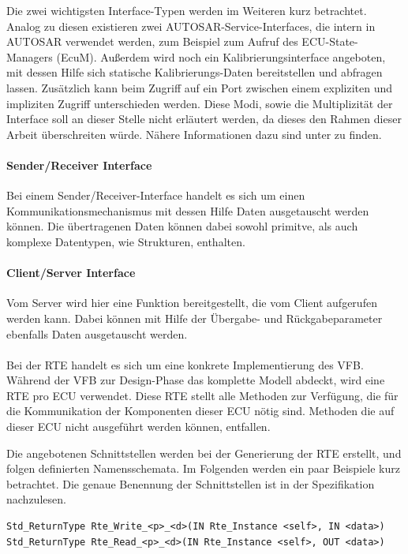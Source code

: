 \documentclass[
  a4paper,					    %
  twoside,
  DIV=calc,     				%
  bibliography=totoc,
  cleardoublepage=empty,
  ngerman,     					%
  final       					%
]{scrbook}
\begin{document}
Die zwei wichtigsten Interface-Typen werden im Weiteren kurz betrachtet. Analog zu diesen existieren zwei AUTOSAR-Service-Interfaces, die intern in AUTOSAR verwendet werden, zum Beispiel zum Aufruf des ECU-State-Managers (EcuM). Außerdem wird noch ein Kalibrierungsinterface angeboten, mit dessen Hilfe sich statische Kalibrierungs-Daten bereitstellen und abfragen lassen. Zusätzlich kann beim Zugriff auf ein Port zwischen einem expliziten und impliziten Zugriff unterschieden werden. Diese Modi, sowie die Multiplizität der Interface soll an dieser Stelle nicht erläutert werden, da dieses den Rahmen dieser Arbeit überschreiten würde. Nähere Informationen dazu sind unter \cite[Seite 101 ff.]{SE_Autosar} zu finden.

\paragraph{Sender/Receiver Interface}
Bei einem Sender/Receiver-Interface handelt es sich um einen Kommunikationsmechanismus mit dessen Hilfe Daten ausgetauscht werden können. Die übertragenen Daten können dabei sowohl primitve, als auch komplexe Datentypen, wie Strukturen, enthalten.

\paragraph{Client/Server Interface}
Vom Server wird hier eine Funktion bereitgestellt, die vom Client aufgerufen werden kann. Dabei können mit Hilfe der Übergabe- und Rückgabeparameter ebenfalls Daten ausgetauscht werden.

\paragraph*{}
Bei der RTE handelt es sich um eine konkrete Implementierung des VFB. Während der VFB zur Design-Phase das komplette Modell abdeckt, wird eine RTE pro ECU verwendet. Diese RTE stellt alle Methoden zur Verfügung, die für die Kommunikation der Komponenten dieser ECU nötig sind. Methoden die auf dieser ECU nicht ausgeführt werden können, entfallen.

Die angebotenen Schnittstellen werden bei der Generierung der RTE erstellt, und folgen definierten Namensschemata. Im Folgenden werden ein paar Beispiele kurz betrachtet. Die genaue Benennung der Schnittstellen ist in der Spezifikation nachzulesen.

\begin{lstlisting}[frame=single, basicstyle=\footnotesize, caption={RTE Beispiele}, label={lst:rte_beispiele}]
Std_ReturnType Rte_Write_<p>_<d>(IN Rte_Instance <self>, IN <data>)
Std_ReturnType Rte_Read_<p>_<d>(IN Rte_Instance <self>, OUT <data>)
\end{lstlisting}
\end{document}
